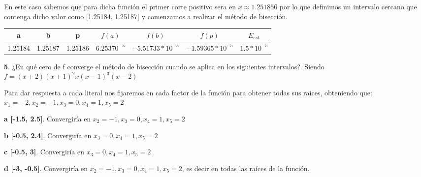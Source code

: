 \documentclass[12pt]{article}
\begin{document}
En este caso sabemos que para dicha función el primer corte positivo sera en $x \approx 1.251856$ por lo que definimos un intervalo cercano que contenga dicho valor como [1.25184, 1.25187]
y comenzamos a realizar el método de bisección. 

\begin{center}
    \begin{tabular}{|c|c|c|c|c|c|c|}
        \hline
        a & b&p&$f(a)$&$f(b)$&$f(p)$&$E_{est}$\\
        \hline
        1.25184    & 1.25187  &  1.25186        & $6.25370^{-5}$& $-5.51733*10^{-5}$ & $-1.59365*10^{-5}$     & $1.5*10^{-5}$\\
        \hline
      \end{tabular} 
\end{center}

\textbf{5}. ¿En qué cero de f converge el método de bisección cuando se aplica en los siguientes intervalos?. Siendo $f = (x+2)(x+1)^2x(x-1)^3(x-2)$

Para dar respuesta a cada literal nos fijaremos en cada factor de la función para obtener todas sus raíces, obteniendo que:
$x_1 = -2, x_2 = -1,  x_3 = 0, x_4 = 1, x_5 = 2$

\textbf{a [-1.5, 2.5]}.
\normalsize\newline
Convergiría en $x_2 = -1,  x_3 = 0, x_4 = 1, x_5 = 2$

\textbf{b [-0.5, 2.4]}.
\normalsize\newline
Convergiría en $x_3 = 0, x_4 = 1, x_5 = 2$

\textbf{c [-0.5, 3]}.
\normalsize\newline
Convergiría en $x_3 = 0, x_4 = 1, x_5 = 2$

\textbf{d [-3, -0.5]}.
\normalsize\newline
Convergiría en $x_2 = -1,  x_3 = 0, x_4 = 1, x_5 = 2$, es decir en todas las raíces de la función. 

\vspace{0.5cm}


\renewcommand{\refname}{\MakeUppercase{REFERENCIAS}}


\end{document}
